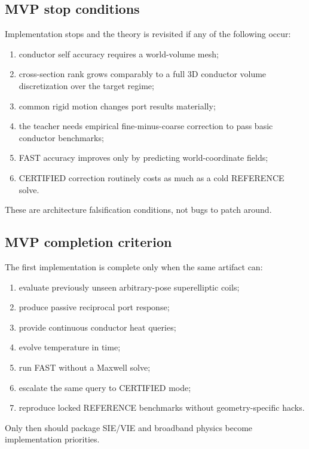 \subsection{MVP stop conditions}

Implementation stops and the theory is revisited if any of the following occur:
\begin{enumerate}
\item conductor self accuracy requires a world-volume mesh;
\item cross-section rank grows comparably to a full 3D conductor volume
      discretization over the target regime;
\item common rigid motion changes port results materially;
\item the teacher needs empirical fine-minus-coarse correction to pass basic
      conductor benchmarks;
\item FAST accuracy improves only by predicting world-coordinate fields;
\item CERTIFIED correction routinely costs as much as a cold REFERENCE solve.
\end{enumerate}

These are architecture falsification conditions, not bugs to patch around.

\subsection{MVP completion criterion}

The first implementation is complete only when the same artifact can:
\begin{enumerate}
\item evaluate previously unseen arbitrary-pose superelliptic coils;
\item produce passive reciprocal port response;
\item provide continuous conductor heat queries;
\item evolve temperature in time;
\item run FAST without a Maxwell solve;
\item escalate the same query to CERTIFIED mode;
\item reproduce locked REFERENCE benchmarks without geometry-specific hacks.
\end{enumerate}
Only then should package SIE/VIE and broadband physics become implementation
priorities.
